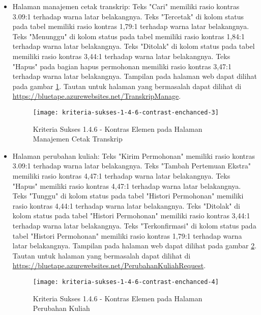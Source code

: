 \begin{itemize}
    \item Halaman manajemen cetak transkrip: Teks "Cari" memiliki rasio kontras 3.09:1 terhadap warna latar belakangnya. Teks "Tercetak" di kolom status pada tabel memiliki rasio kontras 1,79:1 terhadap warna latar belakangnya. Teks "Menunggu" di kolom status pada tabel memiliki rasio kontras 1,84:1 terhadap warna latar belakangnya. Teks "Ditolak" di kolom status pada tabel memiliki rasio kontras 3,44:1 terhadap warna latar belakangnya. Teks "Hapus" pada bagian hapus permohonan memiliki rasio kontras 3,47:1 terhadap warna latar belakangnya. Tampilan pada halaman web dapat dilihat pada gambar \ref{fig:1.4.6_contrast_enchanced_3}. Tautan untuk halaman yang bermasalah dapat dilihat di \url{https://bluetape.azurewebsites.net/TranskripManage}.
    \begin{figure}[H]
        \centering  
        \texttt{[image: kriteria-sukses-1-4-6-contrast-enchanced-3]}  
        \caption[Kriteria Sukses 1.4.6 - Kontras Elemen pada Halaman Manajemen Cetak Transkrip]{Kriteria Sukses 1.4.6 - Kontras Elemen pada Halaman Manajemen Cetak Transkrip}
        \label{fig:1.4.6_contrast_enchanced_3}  
    \end{figure} 
    
    \item Halaman perubahan kuliah: Teks "Kirim Permohonan" memiliki rasio kontras 3.09:1 terhadap warna latar belakangnya. Teks "Tambah Pertemuan Ekstra" memiliki rasio kontras 4,47:1 terhadap warna latar belakangnya. Teks "Hapus" memiliki rasio kontras 4,47:1 terhadap warna latar belakangnya. Teks "Tunggu" di kolom status pada tabel "Histori Permohonan" memiliki rasio kontras 4,44:1 terhadap warna latar belakangnya. Teks "Ditolak" di kolom status pada tabel "Histori Permohonan" memiliki rasio kontras 3,44:1 terhadap warna latar belakangnya. Teks "Terkonfirmasi" di kolom status pada tabel "Histori Permohonan" memiliki rasio kontras 1,79:1 terhadap warna latar belakangnya. Tampilan pada halaman web dapat dilihat pada gambar \ref{fig:1.4.6_contrast_enchanced_4}. Tautan untuk halaman yang bermasalah dapat dilihat di \url{https://bluetape.azurewebsites.net/PerubahanKuliahRequest}.
    \begin{figure}[H]
        \centering  
        \texttt{[image: kriteria-sukses-1-4-6-contrast-enchanced-4]}  
        \caption[Kriteria Sukses 1.4.6 - Kontras Elemen pada Halaman Perubahan Kuliah]{Kriteria Sukses 1.4.6 - Kontras Elemen pada Halaman Perubahan Kuliah}
        \label{fig:1.4.6_contrast_enchanced_4}  
    \end{figure} 
    

\end{itemize}
